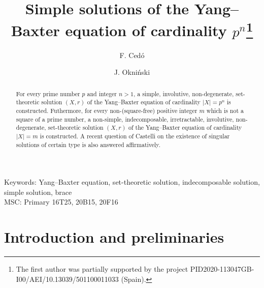 \documentclass[10pt]{article}
\begin{document}
\title{Simple solutions of the Yang--Baxter equation of cardinality $p^n$\thanks{The first author was partially
supported by the project PID2020-113047GB-I00/AEI/10.13039/501100011033 (Spain). }}
\author{F. Ced\'o \and J. Okni\'{n}ski
}
\date{}

\maketitle



\vspace{30pt} \noindent Keywords: Yang--Baxter equation,
set-theoretic solution,
 indecomposable solution,  simple solution, brace\\

 MSC: Primary 16T25, 20B15, 20F16 \\

\begin{abstract}
 For every prime number $p$ and integer $n>1$, a simple,
involutive, non-degenerate, set-theoretic solution $(X,r)$ of the
Yang--Baxter equation of cardinality $|X|=p^n$ is constructed.
Futhermore, for every non-(square-free) positive integer $m$ which
is not a square of a prime number, a non-simple, indecomposable,
irretractable, involutive, non-degenerate, set-theoretic solution
$(X,r)$ of the Yang--Baxter equation of cardinality $|X|=m$ is
constructed. A recent question of Castelli on the existence of singular solutions of certain type is also answered affirmatively.
\end{abstract}



\section{Introduction and preliminaries} \label{prelim}
\end{document}
